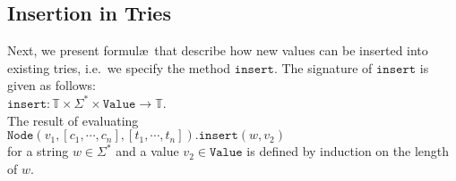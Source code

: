\subsection{Insertion in Tries}
Next, we present formul\ae\ that describe how new values can be inserted into existing tries,
i.e.~we specify the method $\texttt{insert}$.  The signature of $\texttt{insert}$ is given as follows:
\\[0.2cm]
\hspace*{1.3cm}
$\texttt{insert}: \mathbb{T} \times \Sigma^* \times \texttt{Value} \rightarrow \mathbb{T}$.
\\[0.2cm]
The result of evaluating \\[0.2cm]
\hspace*{1.3cm} 
$\texttt{Node}(v_1, [c_1, \cdots, c_n], [t_1, \cdots, t_n]).\texttt{insert}(w, v_2)$
\\[0.2cm]
for a string $w\in \Sigma^*$ and a value $v_2 \in \texttt{Value}$ is defined by induction on the
length of $w$.
